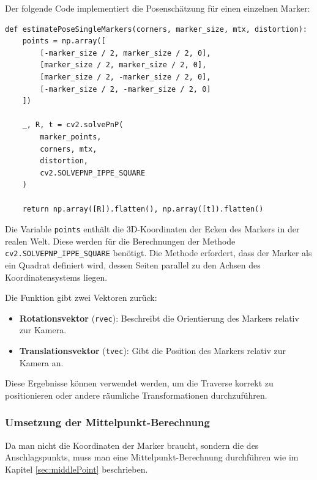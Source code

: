 Der folgende Code implementiert die Posenschätzung für einen einzelnen Marker:



\begin{lstlisting}
def estimatePoseSingleMarkers(corners, marker_size, mtx, distortion):
    points = np.array([
        [-marker_size / 2, marker_size / 2, 0],
        [marker_size / 2, marker_size / 2, 0],
        [marker_size / 2, -marker_size / 2, 0],
        [-marker_size / 2, -marker_size / 2, 0]
    ])

    _, R, t = cv2.solvePnP(
        marker_points, 
        corners, mtx, 
        distortion,
        cv2.SOLVEPNP_IPPE_SQUARE
    )
    
    return np.array([R]).flatten(), np.array([t]).flatten()
\end{lstlisting}

Die Variable \texttt{points} enthält die 3D-Koordinaten der Ecken des Markers in der realen Welt. 
Diese werden für die Berechnungen der Methode  \texttt{cv2.SOLVEPNP\_IPPE\_SQUARE} benötigt. 
Die Methode erfordert, dass der Marker als ein Quadrat definiert wird, dessen Seiten parallel 
zu den Achsen des Koordinatensystems liegen.

Die Funktion gibt zwei Vektoren zurück:
\begin{itemize}
    \item \textbf{Rotationsvektor} (\texttt{rvec}): Beschreibt die Orientierung des Markers relativ zur Kamera.
    \item \textbf{Translationsvektor} (\texttt{tvec}): Gibt die Position des Markers relativ zur Kamera an.
\end{itemize}

Diese Ergebnisse können verwendet werden, um die Traverse korrekt zu positionieren oder andere 
räumliche Transformationen durchzuführen.


\subsubsection{Umsetzung der Mittelpunkt-Berechnung}

Da man nicht die Koordinaten der Marker braucht, sondern die des Anschlagspunkts, muss man eine 
Mittelpunkt-Berechnung durchführen wie im Kapitel \ref{sec:middlePoint} beschrieben.

